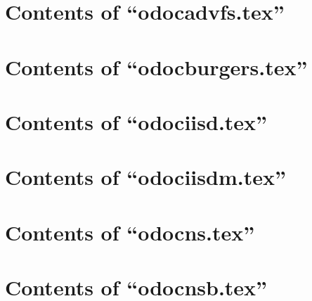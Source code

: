 \begin{itemize}

\end{itemize}

\section{Contents of ``odocadvfs.tex''}

\begin{itemize}

\end{itemize}

\section{Contents of ``odocburgers.tex''}

\begin{itemize}

\end{itemize}

\section{Contents of ``odociisd.tex''}

\begin{itemize}

\end{itemize}

\section{Contents of ``odociisdm.tex''}

\begin{itemize}

\end{itemize}

\section{Contents of ``odocns.tex''}

\begin{itemize}

\end{itemize}

\section{Contents of ``odocnsb.tex''}

\begin{itemize}

\end{itemize}


